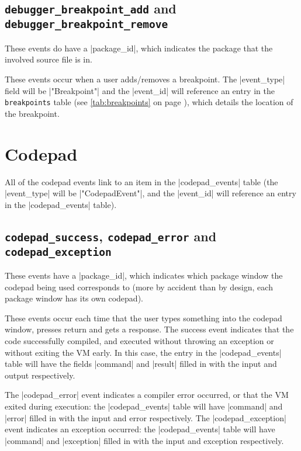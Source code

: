 \documentclass{book}
\newcommand{\myref}[1]{\autoref{#1} on page \pageref*{#1}}
\newcommand{\tabref}[1]{\lstinline|#1| table (see \myref{tab:#1})}
\begin{document}
\subsection{\lstinline|debugger_breakpoint_add| and \lstinline|debugger_breakpoint_remove|}

These events do have a |package_id|, which indicates the package that the
involved source file is in.

These events occur when a user adds/removes a breakpoint.  The |event_type|
field will be |"Breakpoint"| and the |event_id| will reference an entry in
the \tabref{breakpoints}, which details the location of the breakpoint.


\section{Codepad}

All of the codepad events link to an item in the |codepad_events| table (the
|event_type| will be |"CodepadEvent"|, and the |event_id| will reference an
entry in the |codepad_events| table).


\subsection{\lstinline|codepad_success|, \lstinline|codepad_error| and \lstinline|codepad_exception|}

These events have a |package_id|, which indicates which package window the
codepad being used corresponds to (more by accident than by design, each
package window has its own codepad).

These events occur each time that the user types something into the codepad
window, presses return and gets a response.  The success event indicates that the code
successfully compiled, and executed without throwing an exception or without
exiting the VM early.  In this case, the entry in the |codepad_events| table
will have the fields |command| and |result| filled in with the input and
output respectively.

The |codepad_error| event indicates a compiler error occurred, or that the VM
exited during execution: the
|codepad_events| table will have |command| and |error| filled in with the
input and error respectively.  The |codepad_exception| event indicates an exception occurred: the
|codepad_events| table will have |command| and |exception| filled in with the
input and exception respectively.
\end{document}
